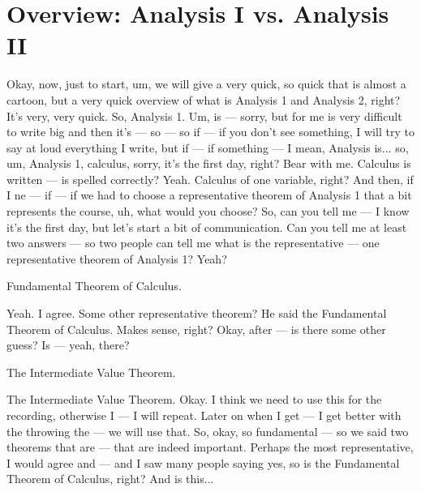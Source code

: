 \section*{Overview: Analysis I vs. Analysis II}

\begin{spoken-clean}[00:05:07 - 00:07:20]
Okay, now, just to start, um, we will give a very quick, so quick that is almost a cartoon, but a very quick overview of what is Analysis 1 and Analysis 2, right? It's very, very quick.  So, Analysis 1. Um, is — sorry, but for me is very difficult to write big and then it's — so — so if — if you don't see something, I will try to say at loud everything I write, but if — if something — I mean, Analysis is... so, um, Analysis 1, calculus, sorry, it's the first day, right? Bear with me. Calculus is written — is spelled correctly? Yeah. Calculus of one variable, right? And then, if I ne — if — if we had to choose a representative theorem of Analysis 1 that a bit represents the course, uh, what would you choose? So, can you tell me — I know it's the first day, but let's start a bit of communication. Can you tell me at least two answers — so two people can tell me what is the representative — one representative theorem of Analysis 1? Yeah?
\end{spoken-clean}

\begin{student-interaction}
Fundamental Theorem of Calculus.
\end{student-interaction}

\begin{spoken-clean}[continued]
Yeah. I agree. Some other representative theorem? He said the Fundamental Theorem of Calculus. Makes sense, right? Okay, after — is there some other guess? Is — yeah, there?
\end{spoken-clean}

\begin{student-interaction}
The Intermediate Value Theorem.
\end{student-interaction}

\begin{spoken-clean}[continued]
The Intermediate Value Theorem. Okay. I think we need to use this for the recording, otherwise I — I will repeat.  Later on when I get — I get better with the throwing the — we will use that. So, okay, so fundamental — so we said two theorems that are — that are indeed important. Perhaps the most representative, I would agree and — and I saw many people saying yes, so is the Fundamental Theorem of Calculus, right? And is this... 
\end{spoken-clean}


